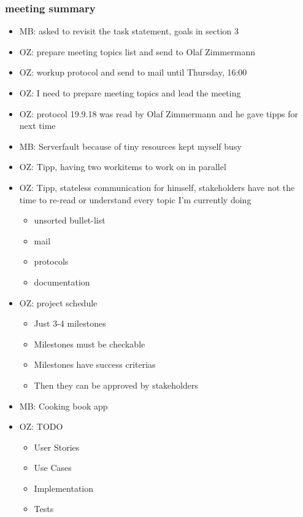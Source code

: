 \documentclass{article}
\begin{document}
\subsubsection{meeting summary}
\begin{itemize}
    \item MB: asked to revisit the task statement, goals in section 3
    \item OZ: prepare meeting topics list and send to Olaf Zimmermann
    \item OZ: workup protocol and send to mail until Thursday, 16:00
    \item OZ: I need to prepare meeting topics and lead the meeting
    \item OZ: protocol 19.9.18 was read by Olaf Zimmermann and he gave tipps for next time
    \item MB: Serverfault because of tiny resources kept myself busy
    \item OZ: Tipp, having two workitems to work on in parallel
    \item OZ: Tipp, stateless communication for himself, stakeholders have not the time to re-read or understand every topic I'm currently doing
        \begin{itemize}
            \item unsorted bullet-list
            \item mail
            \item protocols
            \item documentation
        \end{itemize}   
    \item OZ: project schedule
        \begin{itemize}
            \item Just 3-4 milestones
            \item Milestones must be checkable
            \item Milestones have success criterias
            \item Then they can be approved by stakeholders
        \end{itemize}
    \item MB: Cooking book app
    \item OZ: TODO
        \begin{itemize}
            \item User Stories
            \item Use Cases
            \item Implementation
            \item Tests

\end{itemize}
\end{itemize}
\end{document}
